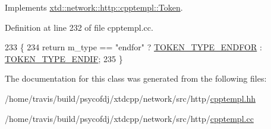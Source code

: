 Implements \hyperlink{classxtd_1_1network_1_1http_1_1cpptempl_1_1Token_afd7dd97138bbac2734e414a406a8e4fe}{xtd\-::network\-::http\-::cpptempl\-::\-Token}.



Definition at line 232 of file cpptempl.\-cc.


\begin{DoxyCode}
233 \{
234   \textcolor{keywordflow}{return} m\_type == \textcolor{stringliteral}{"endfor"} ? \hyperlink{namespacextd_1_1network_1_1http_1_1cpptempl_a39833083d228a5b5ef9f6bb7896479eea7a23df3b1f7078c58e56a3c51c24948c}{TOKEN\_TYPE\_ENDFOR} : 
      \hyperlink{namespacextd_1_1network_1_1http_1_1cpptempl_a39833083d228a5b5ef9f6bb7896479eea20879254cae890cea9ab4fbdb6223165}{TOKEN\_TYPE\_ENDIF};
235 \}
\end{DoxyCode}


The documentation for this class was generated from the following files\-:\begin{DoxyCompactItemize}
\item 
/home/travis/build/psycofdj/xtdcpp/network/src/http/\hyperlink{cpptempl_8hh}{cpptempl.\-hh}\item 
/home/travis/build/psycofdj/xtdcpp/network/src/http/\hyperlink{cpptempl_8cc}{cpptempl.\-cc}\end{DoxyCompactItemize}
